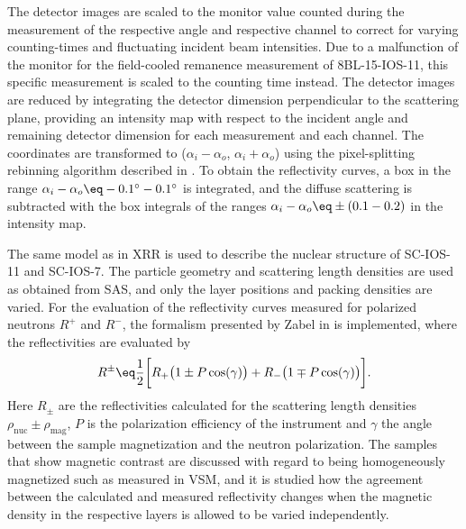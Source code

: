 \documentclass[\main/dresen_thesis.tex]{subfiles}
\begin{document}
    The detector images are scaled to the monitor value counted during the measurement of the respective angle and respective channel to correct for varying counting-times and fluctuating incident beam intensities.
    Due to a malfunction of the monitor for the field-cooled remanence measurement of 8BL-15-IOS-11, this specific measurement is scaled to the counting time instead.
    The detector images are reduced by integrating the detector dimension perpendicular to the scattering plane, providing an intensity map with respect to the incident angle and remaining detector dimension for each measurement and each channel.
    The coordinates are transformed to ($\alpha_i - \alpha_o$, $\alpha_i + \alpha_o$) using the pixel-splitting rebinning algorithm described in .
    To obtain the reflectivity curves, a box in the range $\alpha_i - \alpha_o \eq -0.1 ^\circ - 0.1 ^\circ$ is integrated, and the diffuse scattering is subtracted with the box integrals of the ranges $\alpha_i - \alpha_o \eq \pm (0.1 - 0.2)$ in the intensity map.

    The same model as in XRR is used to describe the nuclear structure of SC-IOS-11 and SC-IOS-7.
    The particle geometry and scattering length densities are used as obtained from SAS, and only the layer positions and packing densities are varied.
    For the evaluation of the reflectivity curves measured for polarized neutrons $R^{+}$ and $R^{-}$, the formalism presented by Zabel \etal in \cite{Kronmueller_2007_Handb} is implemented, where the reflectivities are evaluated by
    \begin{align}
      \label{eq:looselyPackedNP:pnrReflectivityFormula}
      R^\pm \eq \frac{1}{2} \biggl[ R_{+} \bigl(1 \pm P \cos(\gamma) \bigr) + R_{-} \bigl(1 \mp P \cos(\gamma) \bigr) \biggr].
    \end{align}
    Here $R_\pm$ are the reflectivities calculated for the scattering length densities $\rho_\mathrm{nuc} \pm \rho_\mathrm{mag}$, $P$ is the polarization efficiency of the instrument and $\gamma$ the angle between the sample magnetization and the neutron polarization.
    The samples that show magnetic contrast are discussed with regard to being homogeneously magnetized such as measured in VSM, and it is studied how the agreement between the calculated and measured reflectivity changes when the magnetic density in the respective layers is allowed to be varied independently.
\end{document}
